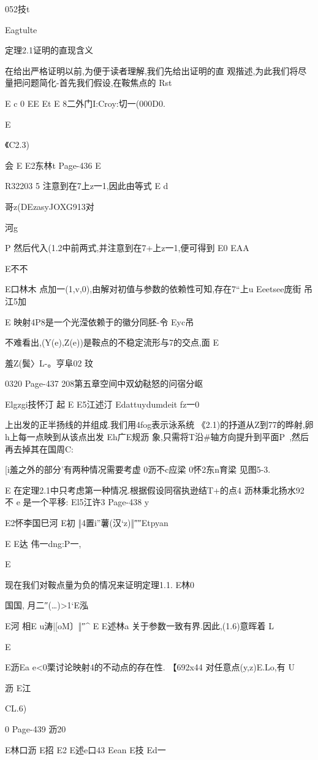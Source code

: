 {{{{{{{{052技t

Eagtulte

定理2.1证明的直现含义

在给出严格证明以前,为便于读者理解,我们先给出证明的直
观揩述,为此我们将尽量把问题简化-首先我们假设,在鞍焦点的
Rst

E
c
0
EE
Et
E
8二外门I:Croy:切一(000D0.

E

《C2.3)

会
E
E2东林t
Page-436
E

R32203
5
注意到在7上z一1,因此由等式
E
d

哥z(DEzasyJOXG913对

河g

P
然后代入(1.2中前两式,并注意到在7+上z一1,便可得到
E0
EAA

E不不

E口林木
点加一(1,v,0),由解对初值与参数的依赖性可知,存在7“上u
Eeetsee庞街
吊江5加

E
映射4P8是一个光滢依赖于的徽分同胚-令
Eyc吊

不难看出,(Y(e),Z(e))是鞍点的不稳定流形与7的交点,面
E

羞Z(鬓〉L-。亨阜02
玟

0320
Page-437
208第五章空间中双幼鞑怒的问宿分岖

Elgzgi技怀汀
起
E
E5江述汀
Edattuydumdeit
fz一0}上出发的正半扬线的并组成.我们用4fog表示泳系统
《2.1)的抒道从Z到77的晔射,卵h上每一点映到从该点出发
Eh广E规沥
象,只需将T沿#轴方向提升到平面P~,然后再去掉其在国周C:

[i羞之外的部分'有两种情况需要考虚
0沥不c应梁
0怀2东n育梁
见图5-3.

E
在定理2.1中只考虑第一种情况.根据假设同宿执逊结T+的点4
沥林秉北扬水92
不
e
是一个平移:
El5江许3
Page-438
y

E2怀李国巳河
E初
‖4置i”薯(汉`z)‖″″Etpyan

E
E达
伟一dng:P一,

E

现在我们对鞍点量为负的情况来证明定理1.1.
E林0

国国,
月二″(…)>1`E泓

E河
相E
u涛|[oM〕‖″^
E
E述林a
关于参数一致有界.因此,(1.6)意晖着
L

E

E沥Ea
e<0栗讨论映射4的不动点的存在性.
【692x44
对任意点(y,z)E.Lo,有
U

沥
E江

CL.6)

0
Page-439
沥20

E林口沥
E招
E2
E述e口43
Eean
E技
Ed一

}}}}}}}

